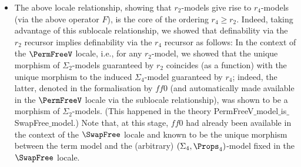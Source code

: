 \begin{itemize}
\begin{itemize}
So this sublocale mechanizes the operator $F$. By definition, $F$ leaves unchanged the $(\textsf{VrD},\textsf{ApD},\alb \textsf{LmD})$-part of the models (i.e., factors through the forgetful operators to the constructor-only signature). Also, one can see that together with the identity on morphisms, $F$ is a functor---but we do not mechanize this fact. 
\end{itemize}
%
\item The above locale relationship, showing that $r_2$-models give rise to $r_4$-models (via the above operator $F$), is the core of the ordering $r_4 \geq r_2$. Indeed, taking advantage of this sublocale relationship, we showed that definability via the $r_2$ recursor implies definability via the $r_4$ recursor as follows: In the context of the $\PermFreeV$ locale, i.e., for any $r_2$-model, we showed that the unique morphism of $\Sigma_2$-models guaranteed by $r_2$ coincides (as a function) with the unique morphism to the induced $\Sigma_4$-model guaranteed by $r_4$; indeed, the latter, denoted in the formalisation by $ff0$ (and automatically made available in the $\PermFreeV$ locale via the sublocale relationship), was shown to be a morphism of  $\Sigma_2$-models. (This happened in the theory \textsf{PermFreeV$\_$\allowbreak{}model$\_$\allowbreak{}is$\_$\allowbreak{}SwapFree$\_$\allowbreak{}model}.) Note that, at this stage, $ff0$ had already been available in the context of the $\SwapFree$ locale and known to be the unique morphism between the term model and the (arbitrary) $(\Sigma_4,\Props_4)$-model fixed in the $\SwapFree$ locale.
\end{itemize} 


